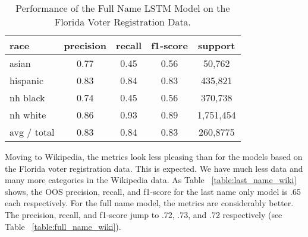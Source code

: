 \documentclass[12pt, letterpaper]{article}
\begin{document}
\begin{table}[h!]
\centering
\caption{Performance of the Full Name LSTM Model on the Florida Voter Registration Data.}
\begin{tabular}{ l c c c c }
\hline    
   race & precision & recall & f1-score & support\\
\hline
   asian & 0.77  & 0.45 & 0.56   &    50,762\\
   hispanic  &  0.83 & 0.84 & 0.83  &    435,821\\
   nh black &  0.74 &  0.45 & 0.56  &    370,738\\
   nh white  & 0.86  & 0.93 & 0.89  &   1,751,454\\

avg / total     &    0.83    &    0.84    &    0.83  &   260,8775\\
\hline
\end{tabular}
\label{table:full_name_fl_voter_reg}
\end{table}

Moving to Wikipedia, the metrics look less pleasing than for the models based on the Florida voter registration data. This is expected. We have much less data and many more categories in the Wikipedia data. As Table ~\ref{table:last_name_wiki} shows, the OOS precision, recall, and f1-score for the last name only model is .65 each respectively. For the full name model, the metrics are considerably better. The precision, recall, and f1-score jump to .72, .73, and .72 respectively (see Table ~\ref{table:full_name_wiki}).
\end{document}
